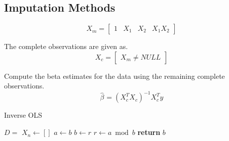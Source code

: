 \documentclass[../paper.tex]{subfiles}
\begin{document}
\subsection{Imputation Methods}

\begin{equation}
X_{m} = \begin{bmatrix} \label{eq:lol}
  1 & X_{1} & X_{2} & X_{1}X_{2}
\end{bmatrix}
\end{equation}

The complete observations are given as.
\begin{equation}
X_{c} = \begin{bmatrix} \label{eq:lol}
  X_{m} \neq NULL
\end{bmatrix}
\end{equation}

Compute the beta estimates for the data using the remaining complete observations.
\begin{equation}
\hat{\beta}_{} = (X_{c}^{T}X_{c})^{-1} X_{c}^{T} y
\end{equation}



\begin{algorithm}
\caption{Inverse OLS}\label{alg:invert}
\begin{algorithmic}[1]
\State $D = $
\State $X_{n}\gets []$
\State $a\gets b$
\State $b\gets r$
\State $r\gets a\bmod b$
\EndWhile\label{euclidendwhile}
\State \textbf{return} $b$
\EndProcedure
\end{algorithmic}
\end{algorithm}
\end{document}
